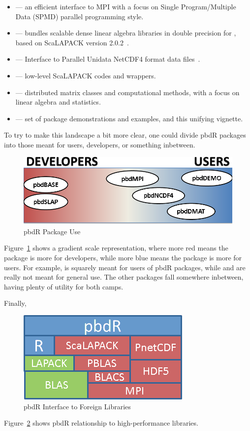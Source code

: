 \begin{itemize}
 \item {} --- an efficient interface to MPI with a focus on Single Program/Multiple Data (SPMD) parallel programming style.
 \item {} --- bundles scalable dense linear algebra libraries in double precision for , based on
                         ScaLAPACK version 2.0.2~\citep{slug}.~
 \item {} --- Interface to Parallel Unidata NetCDF4 format data files~\citep{netcdf}.
 \item {} --- low-level ScaLAPACK codes and wrappers.
 \item {} --- distributed matrix classes and computational methods, with a focus on linear algebra and statistics.
 \item {} --- set of package demonstrations and examples, and this unifying vignette.
\end{itemize}

To try to make this landscape a bit more clear, one could divide pbdR packages into those meant for users, developers, or something inbetween.  
\begin{figure}[h]
 \centering
 \includegraphics[scale=.55]{pbdDEMO-include/pics/pbdR-packages.png}
 \caption{pbdR Package Use}
 \label{fig:pbdrpackages2}
\end{figure}
Figure~\ref{fig:pbdrpackages2} shows a gradient scale representation, where more red means the package is more for developers, while more blue means the package is more for users.  For example,  is squarely meant for users of pbdR packages, while  and  are really not meant for general use.  The other packages fall somewhere inbetween, having plenty of utility for both camps.

Finally, 
\begin{figure}[h]
 \centering
 \includegraphics[scale=.85]{pbdDEMO-include/pics/libs.png}
 \caption{pbdR Interface to Foreign Libraries}
 \label{fig:pbdrlibs}
\end{figure}
Figure~\ref{fig:pbdrlibs} shows pbdR relationship to high-performance libraries.

